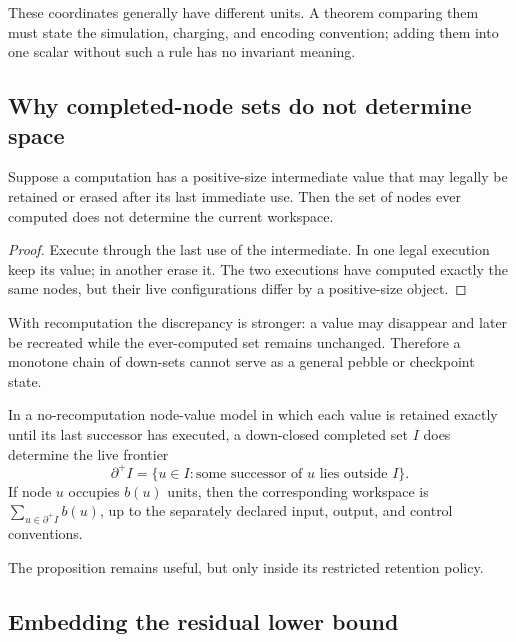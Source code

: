 These coordinates generally have different units.  A theorem comparing them
must state the simulation, charging, and encoding convention; adding them into
one scalar without such a rule has no invariant meaning.

\subsection{Why completed-node sets do not determine space}

\begin{theorem}
\label{thm:completed-set-insufficient}
Suppose a computation has a positive-size intermediate value that may legally
be retained or erased after its last immediate use.  Then the set of nodes ever
computed does not determine the current workspace.
\end{theorem}

\begin{proof}
Execute through the last use of the intermediate.  In one legal execution keep
its value; in another erase it.  The two executions have computed exactly the
same nodes, but their live configurations differ by a positive-size object.
\end{proof}

With recomputation the discrepancy is stronger: a value may disappear and
later be recreated while the ever-computed set remains unchanged.  Therefore a
monotone chain of down-sets cannot serve as a general pebble or checkpoint
state.

\begin{proposition}
\label{prop:restricted-frontier}
In a no-recomputation node-value model in which each value is retained exactly
until its last successor has executed, a down-closed completed set $I$ does
determine the live frontier
\[
  \partial^+ I
  =\{u\in I:\text{some successor of $u$ lies outside $I$}\}.
\]
If node $u$ occupies $b(u)$ units, then the corresponding workspace is
$\sum_{u\in\partial^+I}b(u)$, up to the separately declared input, output, and
control conventions.
\end{proposition}

The proposition remains useful, but only inside its restricted retention
policy.

\subsection{Embedding the residual lower bound}

